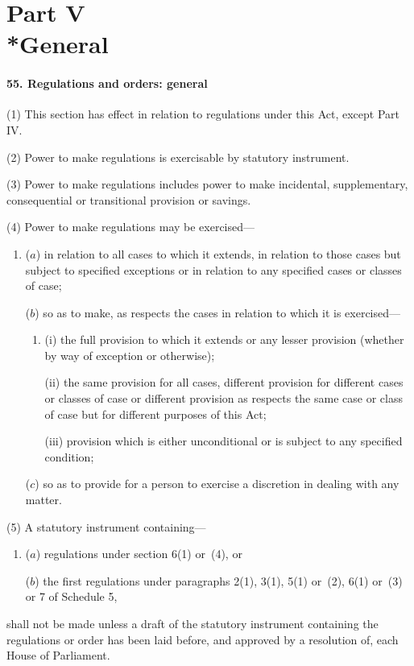 \documentclass[12pt,a4paper]{article}
\begin{document}
\part[Part V --- General]{Part V\\*General}

\renewcommand\parthead{--- Part V}

\subsection{55. Regulations and orders: general}

(1) This section has effect in relation to regulations under this Act, except Part IV.

(2) Power to make regulations is exercisable by statutory instrument.

(3) Power to make regulations includes power to make incidental, supplementary, consequential or transitional provision or savings.

(4) Power to make regulations may be exercised---
\begin{enumerate}\item[]
($a$) in relation to all cases to which it extends, in relation to those cases but subject to specified exceptions or in relation to any specified cases or classes of case;

($b$) so as to make, as respects the cases in relation to which it is exercised---
\begin{enumerate}\item[]
(i) the full provision to which it extends or any lesser provision (whether by way of exception or otherwise);

(ii) the same provision for all cases, different provision for different cases or classes of case or different provision as respects the same case or class of case but for different purposes of this Act;

(iii) provision which is either unconditional or is subject to any specified condition;
\end{enumerate}

($c$) so as to provide for a person to exercise a discretion in dealing with any matter.
\end{enumerate}

(5) A statutory instrument containing---
\begin{enumerate}\item[]
($a$) regulations under section 6(1) or~(4), or

($b$) the first regulations under paragraphs 2(1), 3(1), 5(1) or~(2), 6(1) or~(3) or 7 of Schedule 5,%
%
\end{enumerate}
shall not be made unless a draft of the statutory instrument containing the regulations or order has been laid before, and approved by a resolution of, each House of Parliament.
\end{document}

